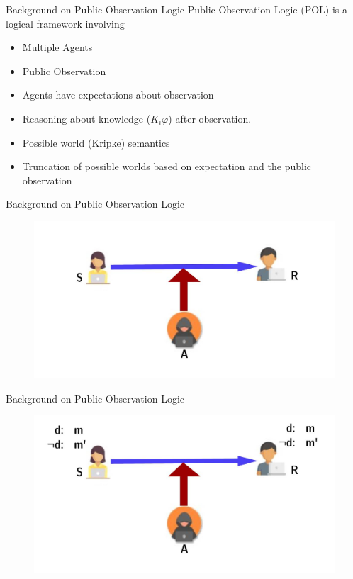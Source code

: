 \documentclass{beamer}
\newcommand\ldiaarg[1]{\langle#1\rangle}
\begin{document}
\begin{frame}{Background on Public Observation Logic}
    Public Observation Logic (POL) is a logical framework involving
    \begin{itemize}
        \item Multiple Agents
        \item Public Observation
        \item Agents have expectations about observation
        \item Reasoning about knowledge ($K_i\varphi$) after observation.
        \item Possible world (Kripke) semantics
        \item Truncation of possible worlds based on expectation and the public observation
    \end{itemize}
\end{frame}

\begin{frame}{Background on Public Observation Logic}
    \begin{figure}
        \centering
        \includegraphics[scale=0.15]{images/comm-slide.jpg}
        \label{fig:my_label}
    \end{figure}
\end{frame}

\begin{frame}{Background on Public Observation Logic}
    \begin{figure}
        \centering
        \includegraphics[scale=0.15]{images/comm-slide-srexpect.jpg}
        \label{fig:my_label}
    \end{figure}
\end{frame}
\end{document}
